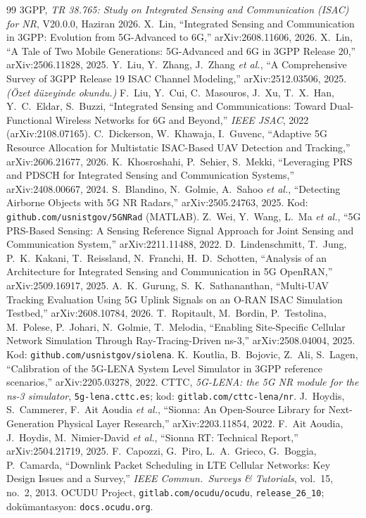 \begin{thebibliography}{99}\sffamily\small
{} 3GPP, \emph{TR 38.765: Study on Integrated Sensing and Communication (ISAC) for NR}, V20.0.0, Haziran 2026.
 X.~Lin, ``Integrated Sensing and Communication in 3GPP: Evolution from 5G-Advanced to 6G,'' arXiv:2608.11606, 2026.
 X.~Lin, ``A Tale of Two Mobile Generations: 5G-Advanced and 6G in 3GPP Release 20,'' arXiv:2506.11828, 2025.
 Y.~Liu, Y.~Zhang, J.~Zhang \emph{et al.}, ``A Comprehensive Survey of 3GPP Release 19 ISAC Channel Modeling,'' arXiv:2512.03506, 2025. \emph{(Özet düzeyinde okundu.)}
 F.~Liu, Y.~Cui, C.~Masouros, J.~Xu, T.~X.~Han, Y.~C.~Eldar, S.~Buzzi, ``Integrated Sensing and Communications: Toward Dual-Functional Wireless Networks for 6G and Beyond,'' \emph{IEEE JSAC}, 2022 (arXiv:2108.07165).
 C.~Dickerson, W.~Khawaja, I.~Guvenc, ``Adaptive 5G Resource Allocation for Multistatic ISAC-Based UAV Detection and Tracking,'' arXiv:2606.21677, 2026.
 K.~Khosroshahi, P.~Sehier, S.~Mekki, ``Leveraging PRS and PDSCH for Integrated Sensing and Communication Systems,'' arXiv:2408.00667, 2024.
 S.~Blandino, N.~Golmie, A.~Sahoo \emph{et al.}, ``Detecting Airborne Objects with 5G NR Radars,'' arXiv:2505.24763, 2025. Kod: \texttt{github.com/usnistgov/5GNRad} (MATLAB).
 Z.~Wei, Y.~Wang, L.~Ma \emph{et al.}, ``5G PRS-Based Sensing: A Sensing Reference Signal Approach for Joint Sensing and Communication System,'' arXiv:2211.11488, 2022.
 D.~Lindenschmitt, T.~Jung, P.~K.~Kakani, T.~Reissland, N.~Franchi, H.~D.~Schotten, ``Analysis of an Architecture for Integrated Sensing and Communication in 5G OpenRAN,'' arXiv:2509.16917, 2025.
 A.~K.~Gurung, S.~K.~Sathananthan, ``Multi-UAV Tracking Evaluation Using 5G Uplink Signals on an O-RAN ISAC Simulation Testbed,'' arXiv:2608.10784, 2026.
 T.~Ropitault, M.~Bordin, P.~Testolina, M.~Polese, P.~Johari, N.~Golmie, T.~Melodia, ``Enabling Site-Specific Cellular Network Simulation Through Ray-Tracing-Driven ns-3,'' arXiv:2508.04004, 2025. Kod: \texttt{github.com/usnistgov/siolena}.
 K.~Koutlia, B.~Bojovic, Z.~Ali, S.~Lagen, ``Calibration of the 5G-LENA System Level Simulator in 3GPP reference scenarios,'' arXiv:2205.03278, 2022.
 CTTC, \emph{5G-LENA: the 5G NR module for the ns-3 simulator}, \texttt{5g-lena.cttc.es}; kod: \texttt{gitlab.com/cttc-lena/nr}.
 J.~Hoydis, S.~Cammerer, F.~Ait Aoudia \emph{et al.}, ``Sionna: An Open-Source Library for Next-Generation Physical Layer Research,'' arXiv:2203.11854, 2022.
 F.~Ait Aoudia, J.~Hoydis, M.~Nimier-David \emph{et al.}, ``Sionna RT: Technical Report,'' arXiv:2504.21719, 2025.
 F.~Capozzi, G.~Piro, L.~A.~Grieco, G.~Boggia, P.~Camarda, ``Downlink Packet Scheduling in LTE Cellular Networks: Key Design Issues and a Survey,'' \emph{IEEE Commun.\ Surveys \& Tutorials}, vol.~15, no.~2, 2013.
 OCUDU Project, \texttt{gitlab.com/ocudu/ocudu}, \texttt{release\_26\_10}; dokümantasyon: \texttt{docs.ocudu.org}.
\end{thebibliography}
